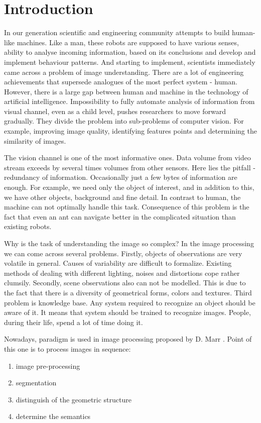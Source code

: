 \documentclass[12pt,a4paper,oneside,titlepage]{article}
\begin{document}
\section*{Introduction}
In our generation scientific and engineering community attempts to build human-like machines.
Like a man, these robots are supposed to have various senses, ability to analyse incoming information, based on its conclusions and develop and implement behaviour patterns.
And starting to implement, scientists immediately came across a problem of image understanding.
There are a lot of engineering achievements that supersede analogues of the most perfect system - human.
However, there is a large gap between human and machine in the technology of artificial intelligence.
Impossibility to fully automate analysis of information from visual channel, even as a child level, pushes researchers to move forward gradually.
They divide the problem into sub-problems of computer vision. 
For example, improving image quality, identifying features points and determining the similarity of images.

The vision channel is one of the most informative ones.
Data volume from video stream exceeds by several times volumes from other sensors.
Here lies the pitfall - redundancy of information.
Occasionally just a few bytes of information are enough.
For example, we need only the object of interest, and in addition to this, we have other objects, background and fine detail.
In contrast to human, the machine can not optimally handle this task.
Consequence of this problem is the fact that even an ant can navigate better in the complicated situation than existing robots.

Why is the task of understanding the image so complex?
In the image processing we can come across several problems.
Firstly, objects of observations are very volatile in general.
Causes of variability are difficult to formalize.
Existing methods of dealing with different lighting, noises and distortions cope rather clumsily.
Secondly, scene observations also can not be modelled.
This is due to the fact that there is a diversity of geometrical forms, colors and textures.
Third problem is knowledge base.
Any system required to recognize an object should be aware of it.
It means that system should be trained to recognize images.
People, during their life, spend a lot of time doing it.

Nowadays, paradigm is used in image processing proposed by D. Marr \cite{marr}.
Point of this one is to process images in sequence:
\begin{enumerate}
  \item image pre-processing
  \item segmentation
  \item distinguish of the geometric structure
  \item determine the semantics
\end{enumerate}
\end{document}
